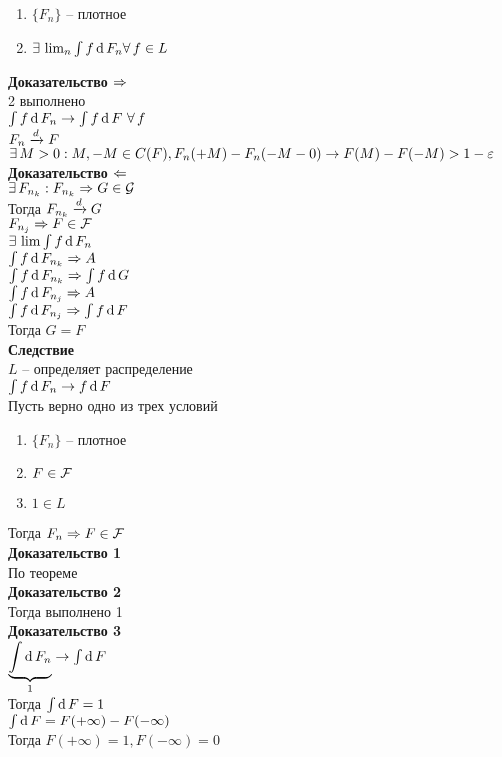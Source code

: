 \documentclass[12pt]{article}
\begin{document}
\begin{enumerate}
    \item $\{F_n\}$ -- плотное\\
    \item $\ex \lim_n \int f\df F_n \fall f \in L$
\end{enumerate}
\textbf{Доказательство $\Rto$}\\
2 выполнено\\
$\int f\df F_n \rto \int f\df F\ \fall f$\\
$F_n \xrto{d} F$\\
$\ex  M > 0: M, -M \in C(F), F_n(+M) - F_n(-M-0) \rto F(M) - F(-M) > 1-\eps$\\
\textbf{Доказательство $\Lto$}\\
$\ex F_{n_k}: F_{n_k} \Rto G \in \mc G$\\
Тогда $F_{n_k} \xrto{d} G$\\
$F_{n_j} \Rto F \in \mc F$\\
$\ex \lim \int f \df F_n$\\
$\int f \df F_{n_k} \Rto A$\\
$\int f \df F_{n_k} \Rto \int f\df G$\\
$\int f \df F_{n_j} \Rto A$\\
$\int f \df F_{n_j} \Rto \int f\df F$\\
Тогда $G = F$\\
\textbf{Следствие}\\
$L$ -- определяет распределение\\
$\int f \df F_n \rto f\df F$\\
Пусть верно одно из трех условий
\begin{enumerate}
    \item $\{F_n\}$ -- плотное
    \item $F \in \mc F$
    \item $1 \in L$
\end{enumerate}
Тогда $F_n \Rto F \in \mc F$\\
\textbf{Доказательство 1}\\
По теореме\\
\textbf{Доказательство 2}\\
Тогда выполнено 1\\ 
\textbf{Доказательство 3}\\
$\ub{1}{\int \df F_n} \rto \int \df F$\\
Тогда $\int \df F = 1$\\
$\int \df F = F(+\infty) - F(-\infty)$\\
Тогда $F(+\infty) = 1, F(-\infty) = 0$\\
\end{document}
